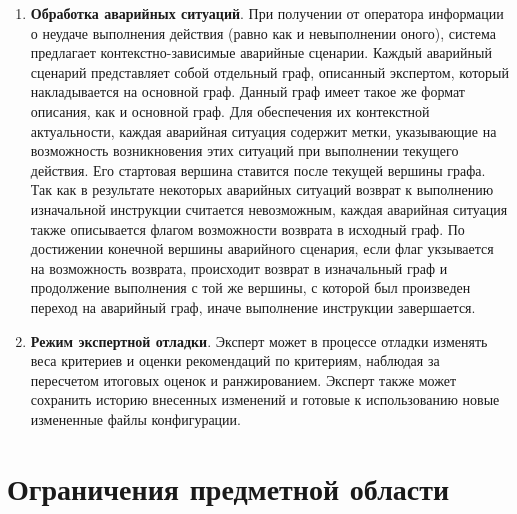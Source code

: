\begin{enumerate}
    \item \textbf{Обработка аварийных ситуаций}.
    При получении от оператора информации о неудаче выполнения действия (равно как и невыполнении оного), система предлагает контекстно-зависимые аварийные сценарии.
    Каждый аварийный сценарий представляет собой отдельный граф, описанный экспертом, который накладывается на основной граф.
    Данный граф имеет такое же формат описания, как и основной граф.
    Для обеспечения их контекстной актуальности, каждая аварийная ситуация содержит метки, указывающие на возможность возникновения этих ситуаций при выполнении текущего действия.
    Его стартовая вершина ставится после текущей вершины графа.
    Так как в результате некоторых аварийных ситуаций возврат к выполнению изначальной инструкции считается невозможным, каждая аварийная ситуация также описывается флагом возможности возврата в исходный граф.
    По достижении конечной вершины аварийного сценария, если флаг укзывается на возможность возврата, происходит возврат в изначальный граф и продолжение выполнения с той же вершины, с которой был произведен переход на аварийный граф, иначе выполнение инструкции завершается.

    \item \textbf{Режим экспертной отладки}. 
    Эксперт может в процессе отладки изменять веса критериев и оценки рекомендаций по критериям, наблюдая за пересчетом итоговых оценок и ранжированием. 
    Эксперт также может сохранить историю внесенных изменений и готовые к использованию новые измененные файлы конфигурации. 

\end{enumerate}

\section{Ограничения предметной области}

